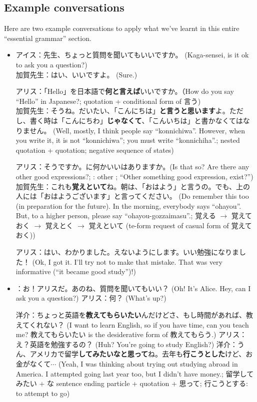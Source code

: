 \documentclass[../nihongo-gakushuu-kyouzai-grammar.tex]{subfiles}
\begin{document}
\subsection{Example conversations}
Here are two example conversations to apply what we've learnt in this entire ``essential grammar'' section.

\begin{itemize}
    \item アイス：先生、ちょっと質問を聞いてもいいですか。 (Kaga-sensei, is it ok to ask you a question?) \\
    加賀先生：はい、いいですよ。 (Sure.)

    アリス：「Hello」を日本語で\textbf{何と言えば}いいですか。（How do you say ``Hello'' in Japanese?; quotation + conditional form of 言う)\\
    加賀先生：そうね。だいたい、「こんにちは」\textbf{と言うと思います}よ。ただし、書く時は「こんにちわ」\textbf{じゃなくて}、「こんいちは」と書かなくてはなりません。 (Well, mostly, I think people say ``konnichiwa''. However, when you write it, it is not ``konnichiwa''; you must write ``konnichiha''.; nested quotation + quotation; negative sequence of states)

    アリス：そうですか。に何かいいはありますか。(Is that so? Are there any other good expressions?; : other ; ``Other something good expression, exist?'')\\
    加賀先生：これも\textbf{覚えといて}ね。朝は、「おはよう」と言うの。でも、上の人には「おはようございます」と言ってください。 (Do remember this too (in preparation for the future). In the morning, everybody says ``ohayou''. But, to a higher person, please say ``ohayou-gozzaimasu''.; 覚える $\to$ 覚えておく $\to$ 覚えとく $\to$ 覚えといて (te-form request of casual form of 覚えておく))

    アリス：はい、わかりました。えないようにします。いい勉強になりました！ (Ok, I got it. I'll try not to make that mistake. That was very informative (``it became good study'')!)
    \item {}：お！アリスだ。あのね、質問を聞いてもいい？ (Oh! It's Alice. Hey, can I ask you a question?)
    アリス：何？ (What's up?)

    洋介：ちょっと英語を\textbf{教えてもらいたい}んだけどさ、もし時間があれば、教えてくれない？ (I want to learn English, so if you have time, can you teach me? 教えてもらいたい is the desiderative form of 教えてもらう.)
    アリス：え？英語を勉強するの？ (Huh? You're going to study English?)
    洋介：うん、アメリカで留学\textbf{してみたいなと思って}ね。去年も\textbf{行こうとした}けど、お金がなくて$\cdots$ (Yeah, I was thinking about trying out studying abroad in America. I attempted going last year too, but I didn't have money.; 留学してみたい + な sentence ending particle + quotation + 思って; 行こうとする: to attempt to go)


\end{itemize}
\end{document}
